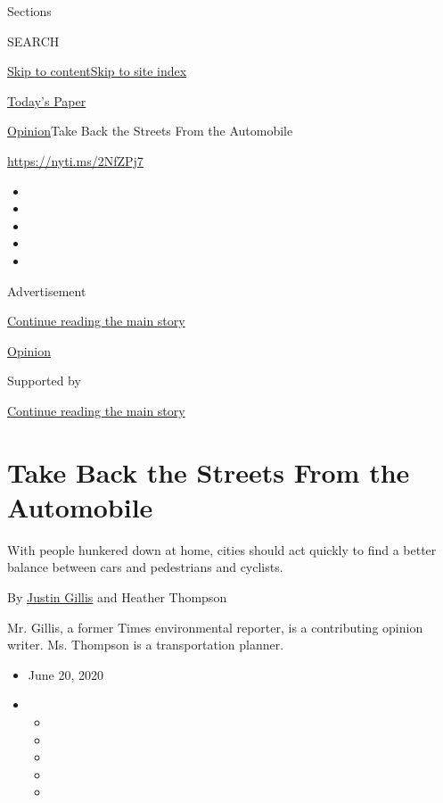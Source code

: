 Sections

SEARCH

\protect\hyperlink{site-content}{Skip to
content}\protect\hyperlink{site-index}{Skip to site index}

\href{https://myaccount.nytimes.com/auth/login?response_type=cookie\&client_id=vi}{}

\href{https://www.nytimes.com/section/todayspaper}{Today's Paper}

\href{/section/opinion}{Opinion}\textbar{}Take Back the Streets From the
Automobile

\href{https://nyti.ms/2NfZPj7}{https://nyti.ms/2NfZPj7}

\begin{itemize}
\item
\item
\item
\item
\item
\end{itemize}

Advertisement

\protect\hyperlink{after-top}{Continue reading the main story}

\href{/section/opinion}{Opinion}

Supported by

\protect\hyperlink{after-sponsor}{Continue reading the main story}

\hypertarget{take-back-the-streets-from-the-automobile}{%
\section{Take Back the Streets From the
Automobile}\label{take-back-the-streets-from-the-automobile}}

With people hunkered down at home, cities should act quickly to find a
better balance between cars and pedestrians and cyclists.

By \href{https://www.nytimes.com/by/justin-gillis}{Justin Gillis} and
Heather Thompson

Mr. Gillis, a former Times environmental reporter, is a contributing
opinion writer. Ms. Thompson is a transportation planner.

\begin{itemize}
\item
  June 20, 2020
\item
  \begin{itemize}
  \item
  \item
  \item
  \item
  \item
  \end{itemize}
\end{itemize}

